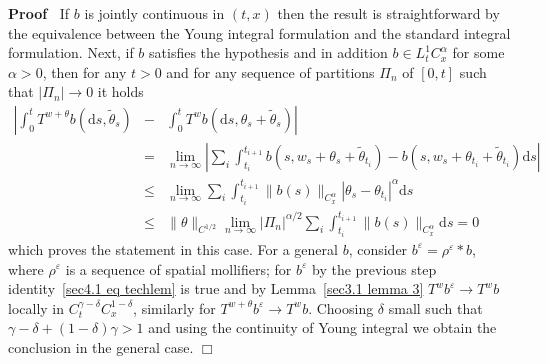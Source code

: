 \documentclass[10pt]{article}
\newcommand{\mathd}{\mathrm{d}}
\newenvironment{proof}{\noindent\textbf{Proof\ }}{\hspace*{\fill}$\Box$\medskip}
\begin{document}
\begin{proof}
  If $b$ is jointly continuous in $(t, x)$ then the result is straightforward
  by the equivalence between the Young integral formulation and the standard
  integral formulation. Next, if $b$ satisfies the hypothesis and in addition
  $b \in L^1_t C^{\alpha}_x$ for some $\alpha > 0$, then for any $t > 0$ and
  for any sequence of partitions $\Pi_n$ of $[0, t]$ such that $| \Pi_n |
  \rightarrow 0$ it holds
  \begin{eqnarray*}
    \left| \int_0^t T^{w + \theta} b (\mathd s, \tilde{\theta}_s) \right. & -
    & \left. \int_0^t T^w b (\mathd s, \theta_s + \tilde{\theta}_s) \right|\\
    & = & \lim_{n \rightarrow \infty} \left| \sum_i \int_{t_i}^{t_{i + 1}} b
    (s, w_s + \theta_s + \tilde{\theta}_{t_i}) - b (s, w_s + \theta_{t_i} +
    \tilde{\theta}_{t_i}) \mathd s \right|\\
    & \leqslant & \lim_{n \rightarrow \infty} \sum_i \int_{t_i}^{t_{i + 1}}
    \| b (s) \|_{C^{\alpha}_x}  | \theta_s - \theta_{t_i} |^{\alpha} \mathd
    s\\
    & \leqslant & \| \theta \|_{C^{1 / 2}} \lim_{n \rightarrow \infty} |
    \Pi_n |^{\alpha / 2} \sum_i \int_{t_i}^{t_{i + 1}} \| b (s)
    \|_{C^{\alpha}_x} \mathd s = 0
  \end{eqnarray*}
  which proves the statement in this case. For a general $b$, consider
  $b^{\varepsilon} = \rho^{\varepsilon} \ast b$, where $\rho^{\varepsilon}$ is
  a sequence of spatial mollifiers; for $b^{\varepsilon}$ by the previous step
  identity~{\eqref{sec4.1 eq techlem}} is true and by Lemma~\ref{sec3.1 lemma
  3} $T^w b^{\varepsilon} \rightarrow T^w b$ locally in $C^{\gamma - \delta}_t
  C^{1 - \delta}_x$, similarly for $T^{w + \theta} b^{\varepsilon} \rightarrow
  T^w b$. Choosing $\delta$ small such that $\gamma - \delta + (1 - \delta)
  \gamma > 1$ and using the continuity of Young integral we obtain the
  conclusion in the general case.
\end{proof}
\end{document}
